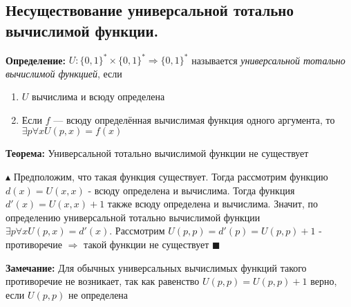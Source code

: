 \subsection{Несуществование универсальной тотально вычислимой функции.}
\par \textbf{Определение:} $U: \{0,1\}^* \times \{0,1\}^* \Rightarrow \{0,1\}^*$ называется \textit{универсальной тотально вычислимой функцией}, если \begin{enumerate}
    \item $U$ вычислима и всюду определена
    \item  Если $f$ — всюду определённая вычислимая функция одного аргумента, то $\exists p \forall x U(p,x) = f (x)$ 
\end{enumerate}
\par \textbf{Теорема:} Универсальной тотально вычислимой функции не существует
\par $\blacktriangle$ Предположим, что такая функция существует. Тогда рассмотрим функцию $d(x)=U(x, x)$ - всюду определена и вычислима. Тогда функция $d'(x)=U(x,x)+1$ также всюду определена и вычислима. Значит, по определению универсальной тотально вычислимой функции $\exists p \forall x U(p,x)=d'(x)$. Рассмотрим $U(p,p)=d'(p)=U(p,p)+1$ - противоречие $\Rightarrow$ такой функции не существует $\blacksquare$
\par \textbf{Замечание:} Для обычных универсальных вычислимых функций такого противоречие не возникает, так как равенство $U(p,p)=U(p,p)+1$ верно, если $U(p,p)$ не определена

